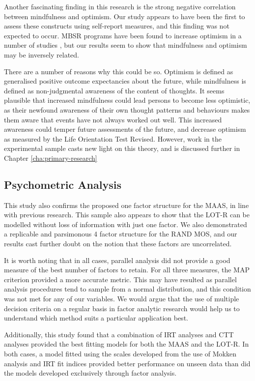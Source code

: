 \documentclass{article}
\begin{document}
Another fascinating finding in this research is the strong negative correlation
between mindfulness and optimism.  Our study appears to have been the first to assess
these constructs using self-report measures, and this finding was not expected to occur.
MBSR programs have been found to increase optimism in a number of studies \cite{Carson2004},
but our results seem to show that mindfulness and optimism may be inversely related.


There are a number of reasons why this could be so.  Optimism is defined as generalised positive outcome expectancies about the future,
while mindfulness is defined as non-judgmental awareness of the content of thoughts.
It seems plausible that increased mindfulness could lead persons to become less optimistic,
 as their newfound awareness of their own thought patterns and behaviours makes them aware
that events have not always worked out well.  This increased awareness could temper future
assessments of the future, and decrease optimism as measured by the Life Orientation Test Revised. However, work in the experimental sample casts new light on this theory, and is discussed further in Chapter \ref{cha:primary-research}

\subsection{Psychometric Analysis}
\label{sec:psych-analys}



This study also confirms the proposed one factor structure for the MAAS, in line with previous research.
This sample also appears to show that the LOT-R can be modelled without loss of information with
just one factor.  We also demonstrated a replicable and parsimonous 4 factor structure for the RAND MOS,
and our results cast further doubt on the notion that these factors are uncorrelated.

It is worth noting that in all cases, parallel analysis did not provide a good measure of
the best number of factors to retain.  For all three measures, the MAP criterion provided
a more accurate metric.  This may have resulted as parallel analysis procedures tend
to sample from a normal distribution, and this condition was not met for any of our
variables.  We would argue that the use of multiple decision criteria on a regular basis
in factor analytic research would help us to understand which method suits a particular
application best.

Additionally, this study found that a combination of IRT analyses and CTT analyses provided the best fitting models for both the MAAS and the LOT-R. In both cases, a model fitted using the scales developed from the use of Mokken analysis and IRT fit indices provided better performance on unseen data than did the models developed exclusively through factor analysis. 
\end{document}
